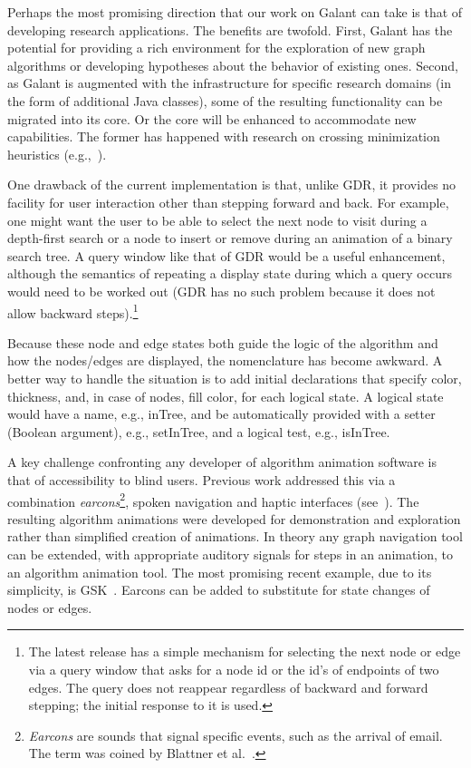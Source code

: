 Perhaps the most promising direction that our work on Galant can take is that
of developing research applications.  The benefits are twofold.  First,
Galant has the potential for providing a rich environment for the exploration
of new graph algorithms or developing hypotheses about the behavior of
existing ones.  Second, as Galant is augmented with the infrastructure for
specific research domains (in the form of additional Java classes), some of the
resulting functionality can be migrated into its core. Or the core
will be enhanced to accommodate new capabilities. The former
has happened with research on crossing
minimization heuristics (e.g.,~\cite{2012-JEA-Stallmann}).

One drawback of the current implementation is
that, unlike GDR, it provides no facility for user interaction other than stepping forward
and back.
For example, one might want the user to be able to select the next node to
visit during a depth-first search or a node to insert or remove during an animation of
a binary search tree.
A query window like that of GDR would be a useful enhancement, although the semantics of
repeating a display state during which a query occurs would need to be worked out
(GDR has no such problem because it does not allow backward steps).\footnote{
  The latest release has a simple mechanism for selecting the next node or edge
  via a query window that asks for a node id or the id's of endpoints of two edges.
  The query does not reappear regardless of backward and forward stepping;
  the initial response to it is used.
}

  Because these node and edge states both guide the logic of the algorithm
  and how the nodes/edges are displayed, the nomenclature has become awkward.
  A better way to handle the situation is to add initial declarations
  that specify color, thickness, and, in case of nodes, fill color, for each logical state.
  A logical state would have a name, e.g., \textsf{inTree},
  and be automatically provided with a setter (Boolean argument),
  e.g., \textsf{setInTree}, and a logical test, e.g., \textsf{isInTree}.

A key challenge confronting any developer of algorithm animation
software is that of accessibility to blind users.
Previous work addressed this via a combination \emph{earcons}\footnote{
\emph{Earcons} are sounds that signal specific events, such as the arrival of email. The term was coined by Blattner et al.~\cite{1989-HCI-Blattner-earcons}.
}, spoken navigation
and haptic interfaces
(see~\cite{2002-SoftViz-Baloian,2005-SCCC-Baloian,2002-Diagrams-Bennett}).
The resulting algorithm animations were developed for demonstration and exploration rather than simplified
creation of
animations.
In theory any graph navigation tool can be extended, with appropriate auditory
signals for steps in an animation, to an algorithm animation tool.
The most promising recent example, due to its simplicity, is GSK~\cite{2013-SIGCSE-Balik}.
Earcons can be added to substitute for state changes of nodes or edges.

